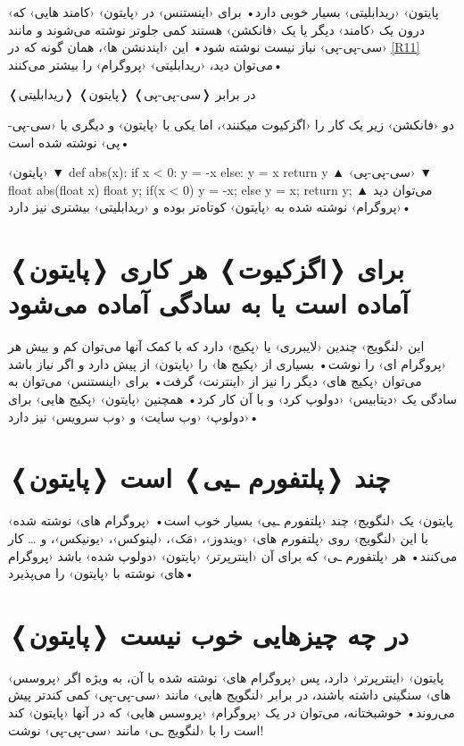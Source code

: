 \documentclass[openany, twocolumn]{book}
\begin{document}
‹پایتون› ‹ریدابلیتی› بسیار خوبی دارد• برای ‹اینستنس› در ‹پایتون› ‹کامند هایی› که درون یک ‹کامند› دیگر یا یک ‹فانکشن› هستند کمی جلو‌تر نوشته می‌شوند و مانند ‹سی-پی-پی› نیاز نیست \code{\{\}} نوشته شود• این ‹ایندنشن ها›، همان گونه که در \ref{R11} می‌توان دید، ‹ریدابلیتی› ‹پروگرام› را بیشتر می‌کنند•

\begin{Program}
\caption{❬ریدابلیتی❭ ❬پایتون❭ در برابر ❬سی-پی-پی❭\label{R11}}

دو ‹فانکشن› زیر یک کار را ‹اگزکیوت میکنند›، اما یکی با ‹پایتون› و دیگری با ‹سی-پی-پی› نوشته شده است•

‹پایتون› 
▼
def abs(x):
	if x < 0:
		y = -x
	else:
		y = x
	return y
▲
 ‹سی-پی-پی› \lstset{language=cpp}
▼
float abs(float x)
{
	float y;
	if(x < 0)
	{
		y = -x;
	}
	else
	{
		y = x;
	}
	return y;
}
▲
 می‌توان دید ‹پروگرام› نوشته شده به ‹پایتون› کوتاه‌تر بوده و ‹ریدابلیتی› بیشتری نیز دارد•
\end{Program}

\section{❬پایتون❭ برای ❬اگزکیوت❭ هر کاری آماده است یا به سادگی آماده می‌شود}
این ‹لنگویج› چندین ‹لایبرری› یا ‹پکیج› دارد که با کمک آنها می‌توان کم و بیش هر ‹پروگرام ای› را نوشت• بسیاری از ‹پکیج ها› را ‹پایتون› از پیش دارد و اگر نیاز باشد می‌توان ‹پکیج های› دیگر را نیز از ‹اینترنت› گرفت• برای ‹اینستنس› می‌توان به سادگی یک ‹دیتابیس› ‹دولوپ کرد› و با آن کار کرد• همچنین ‹پایتون› ‹پکیج هایی› برای ‹دولوپ› ‹وب سایت› و ‹وب سرویس› نیز دارد•

\section{❬پایتون❭ چند ❬پلتفورم ـیی❭ است}
‹پایتون› یک ‹لنگویج› چند ‹پلتفورم ـیی› بسیار خوب است• ‹پروگرام های› نوشته شده با این ‹لنگویج› روی ‹پلتفورم های› ‹ویندوز›، ‹مَک›، ‹لینوکس›، ‹یونیکس›، و \ldots{} کار می‌کنند• هر ‹پلتفورم ـی› که برای آن ‹اینترپرتر› ‹پایتون› ‹دولوپ شده› باشد ‹پروگرام های› نوشته با ‹پایتون› را می‌پذیرد•

\section{❬پایتون❭ در چه چیز‌هایی خوب نیست}
‹پایتون› ‹اینترپرتر› دارد، پس ‹پروگرام های› نوشته شده با آن، به ویژه اگر ‹پروسس های› سنگینی داشته باشند، در برابر ‹لنگویج هایی› مانند ‹سی-پی-پی› کمی کند‌تر پیش می‌روند• خوشبختانه، می‌توان در یک ‹پروگرام› ‹پروسس هایی› که در آنها ‹پایتون› کند است را با ‹لنگویج ـی› مانند ‹سی-پی-پی› نوشت!
\end{document}
